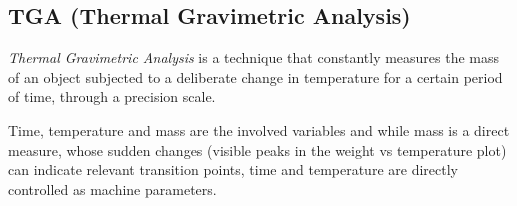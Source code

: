 \documentclass{article}
\begin{document}
%
%
%

        \clearpage
        \subsection{TGA (Thermal Gravimetric Analysis)\label{TGA_Analysis}}
        
        \textit{Thermal Gravimetric Analysis} is a technique that constantly measures the mass of an object subjected to a deliberate 
        change in temperature for a certain period of time, through a precision scale. 

        Time, temperature and mass are the involved variables and while mass is a direct measure, whose sudden changes (visible peaks
        in the weight vs temperature plot) can indicate relevant transition points, time and temperature are directly controlled 
        as machine parameters. \\ 
\end{document}
